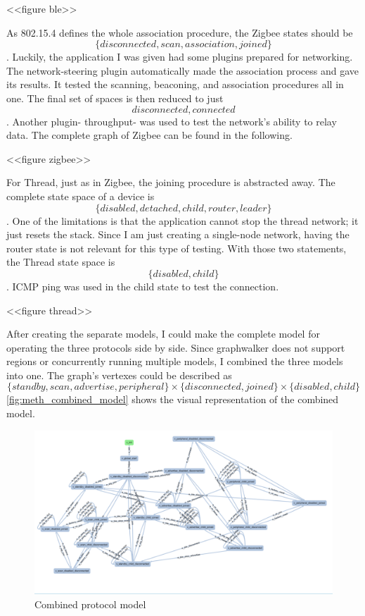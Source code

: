 <<figure ble>>

As 802.15.4 defines the whole association procedure, the Zigbee states should be \[
    \{disconnected, scan, association, joined\}
\]. Luckily, the application I was given had some plugins prepared for networking. The network-steering plugin automatically made the association process and gave its results. It tested the scanning, beaconing, and association procedures all in one. The final set of spaces is then reduced to just \[
    {disconnected, connected}
\]. Another plugin- throughput- was used to test the network's ability to relay data. The complete graph of Zigbee can be found in the following.

<<figure zigbee>>

For Thread, just as in Zigbee, the joining procedure is abstracted away.
The complete state space of a device is \[
    \{disabled, detached, child, router, leader\}  
\]. One of the limitations is that the application cannot stop the thread network; it just resets the stack. Since I am just creating a single-node network, having the router state is not relevant for this type of testing. With those two statements, the Thread state space is \[
    \{disabled, child\}  
\]. ICMP ping was used in the child state to test the connection.

<<figure thread>>

After creating the separate models, I could make the complete model for operating the three protocols side by side. Since graphwalker does not support regions or concurrently running multiple models, I combined the three models into one. The graph's vertexes could be described as \[
    \{standby, scan, advertise, peripheral\} \times  \{disconnected, joined\} \times \{disabled, child\}  
\]
\autoref{fig:meth_combined_model} shows the visual representation of the combined model.

\begin{figure}
    \centering
    \includegraphics[width=150mm, keepaspectratio]{figures/combined_model.png}
    \caption{Combined protocol model}
    \label{fig:meth_combined_model}
\end{figure}


